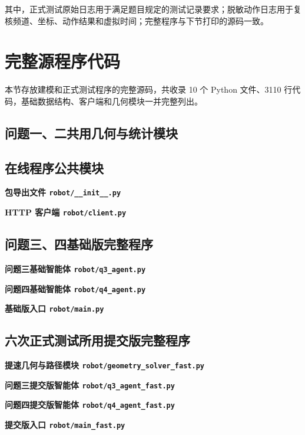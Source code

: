 \begin{appendices}
其中，正式测试原始日志用于满足题目规定的测试记录要求；脱敏动作日志用于复核频道、坐标、动作结果和虚拟时间；完整程序与下节打印的源码一致。

\section{完整源程序代码}

本节存放建模和正式测试程序的完整源码，共收录 10 个 Python 文件、3110 行代码，基础数据结构、客户端和几何模块一并完整列出。

\subsection{问题一、二共用几何与统计模块}


\subsection{在线程序公共模块}

\textbf{包导出文件 \texttt{robot/\_\_init\_\_.py}}


\textbf{HTTP 客户端 \texttt{robot/client.py}}


\subsection{问题三、四基础版完整程序}

\textbf{问题三基础智能体 \texttt{robot/q3\_agent.py}}


\textbf{问题四基础智能体 \texttt{robot/q4\_agent.py}}


\textbf{基础版入口 \texttt{robot/main.py}}


\subsection{六次正式测试所用提交版完整程序}

\textbf{提速几何与路径模块 \texttt{robot/geometry\_solver\_fast.py}}


\textbf{问题三提交版智能体 \texttt{robot/q3\_agent\_fast.py}}


\textbf{问题四提交版智能体 \texttt{robot/q4\_agent\_fast.py}}


\textbf{提交版入口 \texttt{robot/main\_fast.py}}


\end{appendices}
